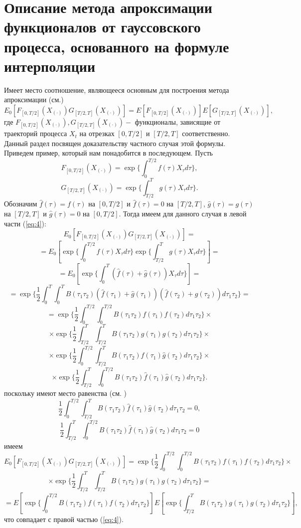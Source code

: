 \documentclass [a4paper, 12pt]{report}
\begin{document}
\pagebreak
\chapter{Описание метода апроксимации функционалов от гауссовского процесса, основанного на формуле интерполяции}

Имеет место соотношение, являющееся основным для построения метода
апроксимации (см.\cite{b1})
\begin{equation}
E_0[F_{[0,T/2]}(X_{(\cdot)})G_{[T/2,T]}(X_{(\cdot)})]=
E[F_{[0,T/2]}(X_{(\cdot)})]E[G_{[T/2,T]}(X_{(\cdot)})],
\label{eq:4}
\end{equation}
где $F_{[0,T/2]}(X_{(\cdot)}), G_{[T/2,T]}(X_{(\cdot)}) - $
функционалы, зависящие от траекторий процесса $X_t$ на
отрезках $[0,T/2]$ и $[T/2, T]$ соответственно. \\

Данный раздел посвящен  доказательству частного случая этой формулы.
Приведем пример, который нам понадобится в последующем. Пусть
$$
F_{[0,T/2]}(X_{(\cdot)}) = \exp\{\int_{0}^{T/2}f(\tau)X_{\tau}d\tau\},
$$
$$
G_{[T/2,T]}(X_{(\cdot)}) = \exp\{\int_{T/2}^{T}g(\tau)X_{\tau}d\tau\}.
$$
Обозначим $\hat{f}(\tau)=f(\tau)$ на $[0, T/2]$
и $\hat{f}(\tau)=0$ на $[T/2, T]$,
$\hat{g}(\tau)=g(\tau)$ на $[T/2, T]$
и $\hat{g}(\tau)=0$ на $[0, T/2]$.
Тогда имеем для данного случая в левой части (\ref{eq:4}):
$$
E_0[F_{[0,T/2]}(X_{(\cdot)})G_{[T/2,T]}(X_{(\cdot)})]=
$$
$$
=E_0[\exp\{\int_{0}^{T/2} f(\tau)X_{\tau}d\tau\}
\exp\{\int_{T/2}^{T} g(\tau)X_{\tau}d\tau\}]=
$$
$$
=E_0[\exp\{\int_{0}^{T}(\hat{f}(\tau)+\hat{g}(\tau))X_{\tau}d\tau\}]=
$$
$$
=\exp\{\frac{1}{2}\int_{0}^{T}\int_{0}^{T}B(\tau_1\tau_2)
(\hat{f}(\tau_1)+\hat{g}(\tau_1))(\hat{f}(\tau_2)+\hat{g}(\tau_2))
d\tau_1\tau_2\}=
$$
$$
= \exp\{\frac{1}{2}\int_{0}^{T/2}\int_{0}^{T/2}B(\tau_1\tau_2)
f(\tau_1)f(\tau_2)d\tau_1\tau_2\} \times
$$
$$
\times \exp\{\frac{1}{2}\int_{T/2}^{T}\int_{T/2}^{T}B(\tau_1\tau_2)
g(\tau_1)g(\tau_2)d\tau_1\tau_2\} \times
$$
$$
\times \exp\{\frac{1}{2}\int_{0}^{T/2}\int_{T/2}^{T}B(\tau_1\tau_2)
\hat{f}(\tau_1)\hat{g}(\tau_2)d\tau_1\tau_2\} \times
$$
$$
\times \exp\{\frac{1}{2}\int_{T/2}^{T}\int_{0}^{T/2}B(\tau_1\tau_2)
\hat{f}(\tau_1)\hat{g}(\tau_2)d\tau_1\tau_2\}.
$$
поскольку имеют место равенства (см. \cite{b1})
$$
\frac{1}{2}\int_{0}^{T/2}\int_{T/2}^{T}B(\tau_1\tau_2)
\hat{f}(\tau_1)\hat{g}(\tau_2)d\tau_1\tau_2 = 0,
$$
$$
\frac{1}{2}\int_{T/2}^{T}\int_{0}^{T/2}B(\tau_1\tau_2)
\hat{f}(\tau_1)\hat{g}(\tau_2)d\tau_1\tau_2 = 0
$$
имеем
$$
E_0[F_{[0,T/2]}(X_{(\cdot)})G_{[T/2,T]}(X_{(\cdot)})]=
\exp\{\frac{1}{2}\int_{0}^{T/2}\int_{0}^{T/2}B(\tau_1\tau_2)
f(\tau_1)f(\tau_2)d\tau_1\tau_2\} \times
$$
$$
\times \exp\{\frac{1}{2}\int_{T/2}^{T}\int_{T/2}^{T}B(\tau_1\tau_2)
g(\tau_1)g(\tau_2)d\tau_1\tau_2\} =
$$
$$
= E[\exp\{\int_{0}^{T/2}B(\tau_1\tau_2)
f(\tau_1)f(\tau_2)d\tau_1\tau_2\}]
E[\exp\{\int_{T/2}^{T}B(\tau_1\tau_2)
g(\tau_1)g(\tau_2)d\tau_1\tau_2\}],
$$
что совпадает с правой частью (\ref{eq:4}).
\end{document}
